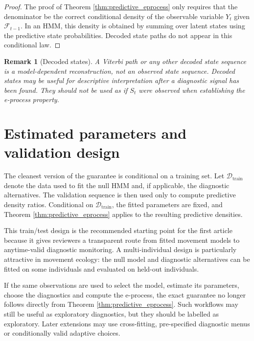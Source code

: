 \documentclass[11pt]{article}
\newtheorem{remark}{Remark}
\begin{document}
\begin{proof}
The proof of Theorem \ref{thm:predictive_eprocess} only requires that the denominator be the correct conditional density of the observable variable $Y_t$ given $\mathcal F_{t-1}$. In an HMM, this density is obtained by summing over latent states using the predictive state probabilities. Decoded state paths do not appear in this conditional law.
\end{proof}

\begin{remark}[Decoded states]
A Viterbi path or any other decoded state sequence is a model-dependent reconstruction, not an observed state sequence. Decoded states may be useful for descriptive interpretation after a diagnostic signal has been found. They should not be used as if $S_t$ were observed when establishing the e-process property.
\end{remark}

\section{Estimated parameters and validation design}

The cleanest version of the guarantee is conditional on a training set. Let $\mathcal D_{\mathrm{train}}$ denote the data used to fit the null HMM and, if applicable, the diagnostic alternatives. The validation sequence is then used only to compute predictive density ratios. Conditional on $\mathcal D_{\mathrm{train}}$, the fitted parameters are fixed, and Theorem \ref{thm:predictive_eprocess} applies to the resulting predictive densities.

This train/test design is the recommended starting point for the first article because it gives reviewers a transparent route from fitted movement models to anytime-valid diagnostic monitoring. A multi-individual design is particularly attractive in movement ecology: the null model and diagnostic alternatives can be fitted on some individuals and evaluated on held-out individuals.

If the same observations are used to select the model, estimate its parameters, choose the diagnostics and compute the e-process, the exact guarantee no longer follows directly from Theorem \ref{thm:predictive_eprocess}. Such workflows may still be useful as exploratory diagnostics, but they should be labelled as exploratory. Later extensions may use cross-fitting, pre-specified diagnostic menus or conditionally valid adaptive choices.
\end{document}
